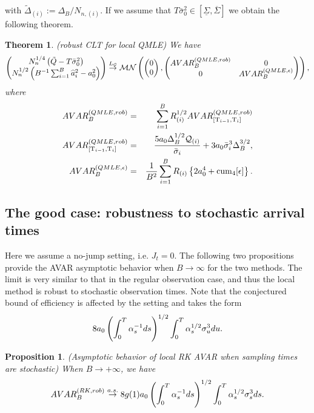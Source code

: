\documentclass[11pt]{article}
\numberwithin{equation}{section}
\newcommand{\Tau}{\mathrm{T}}
\theoremstyle{plain}
\newtheorem{QMLEjumps}[RK0]{Theorem}
\newtheorem{RKcorRobust}[RK0]{Proposition}
\theoremstyle{remark}
\begin{document}
with $\widetilde{\Delta}_{(i)} :=\Delta_B /N_{n,(i)}$. If we assume that $T\bar{\sigma}_0^2 \in [\underline{\Sigma}, \overline{\Sigma}]$ we obtain the following theorem.
\begin{QMLEjumps} \label{CLTQMLEjumps} (robust CLT for local QMLE) We have 
$$\left(\begin{matrix} N_n^{1/4} \left(\tilde{Q} - T\bar{\sigma}_0^2 \right) \\ 
N_n^{1/2} \left( B^{-1} \sum_{i=1}^B \widehat{a}_i^2 - a_0^2 \right) 
\end{matrix}\right) \overset{L_{\mathcal{G}}}{\rightarrow} {\cal M}{\cal N} \left( \left(\begin{matrix} 0 \\ 
0 
\end{matrix}\right), \left(\begin{matrix}  AVAR_B^{(QMLE,rob)} & 0\\ 0 & AVAR_B^{(QMLE,\epsilon)}
\end{matrix}\right)  \right),$$
where
\begin{eqnarray*}
AVAR_B^{(QMLE,rob)} &=& \sum_{i=1}^B R_{(i)}^{1/2} AVAR_{[\Tau_{i-1},\Tau_i]}^{(QMLE,rob)} \\
 AVAR_{[\Tau_{i-1},\Tau_i]}^{(QMLE,rob)} & = & \frac{ 5   a_0\Delta_B^{1/2} \calq_{(i)}}{ \bar{\sigma}_{i} } + 3 a_0 \bar{\sigma}_{i}^3\Delta_B^{3/2},\\ 
 AVAR_B^{(QMLE,\epsilon)} & = & \inv{B^2}\sum_{i=1}^B{R_{(i)}} \l\{2 a_0^4 + \textnormal{cum}_4[\epsilon]\r\}.
\end{eqnarray*}
\end{QMLEjumps}



\subsection{The good case: robustness to stochastic arrival times}
Here we assume a no-jump setting, i.e. $J_t=0$. The following two propositions provide the AVAR asymptotic behavior when $B \rightarrow \infty$ for the two methods. The limit is very similar to that in the regular observation case, and thus the local method is robust to stochastic observation times. Note that the conjectured bound of efficiency is affected by the setting and takes the form 
$$8 a_0 \left(\int_0^T\alpha_s^{-1}ds\right)^{1/2}\int_0^T \alpha_s^{1/2} \sigma_u^3 du.$$
\begin{RKcorRobust} \label{RKcorRobust} (Asymptotic behavior of local RK AVAR when sampling times are stochastic) When $B \to +\infty$, we have 
$$ AVAR_B^{(RK,rob)} \overset{a.s.}{\rightarrow} 8g(1)a_0\left(\int_0^T\alpha_s^{-1}ds\right)^{1/2} \int_0^T{\alpha_s^{1/2}\sigma_s^3}ds.$$
\end{RKcorRobust}
\end{document}
